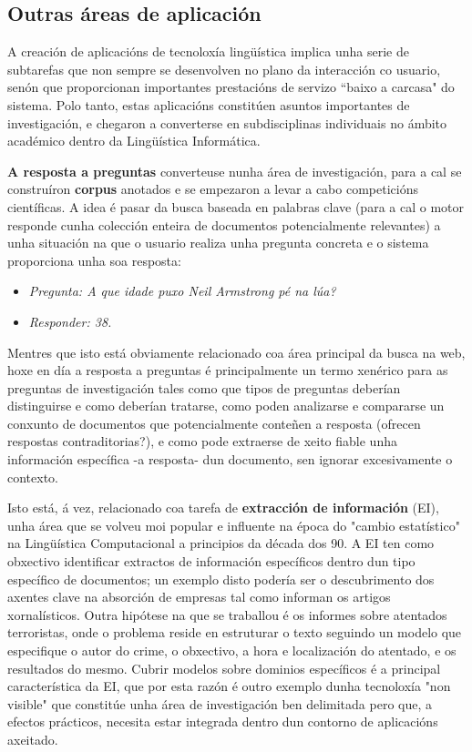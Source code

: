\begin{multicols}{2}
\subsection{Outras áreas de aplicación}

   A creación de aplicacións de tecnoloxía lingüística implica unha serie de subtarefas que non sempre se desenvolven no plano da interacción co usuario, senón que proporcionan importantes prestacións de servizo “baixo a carcasa" do sistema. Polo tanto, estas aplicacións constitúen asuntos importantes de investigación, e chegaron a converterse en subdisciplinas individuais no ámbito académico dentro da Lingüística Informática. 

\textbf{A resposta a preguntas} converteuse nunha área de investigación, para a cal se construíron \textbf{corpus} anotados e se empezaron a levar a cabo competicións científicas. A idea é pasar da busca baseada en palabras clave (para a cal o motor responde cunha colección enteira de documentos potencialmente relevantes) a unha situación na que o usuario realiza unha pregunta concreta e o sistema proporciona unha soa resposta:

\begin{itemize}
\item[] \textit{Pregunta: A que idade puxo Neil Armstrong pé na lúa?}
\item[] \textit{Responder: 38.}
\end{itemize}

Mentres que isto está obviamente relacionado coa área principal da busca na web, hoxe en día a resposta a preguntas é principalmente un termo xenérico para as preguntas de investigación tales como que tipos de preguntas deberían distinguirse e como deberían tratarse, como poden analizarse e compararse un conxunto de documentos que potencialmente conteñen a resposta (ofrecen respostas contraditorias?), e como pode extraerse de xeito fiable unha información específica -a resposta- dun documento, sen ignorar excesivamente o contexto. 

Isto está, á vez, relacionado coa tarefa de \textbf{extracción de información} (EI), unha área que se volveu moi popular e influente na época do "cambio estatístico" na Lingüística Computacional a principios da década dos 90. A EI ten como obxectivo identificar extractos de información específicos dentro dun tipo específico de documentos; un exemplo disto podería ser o descubrimento dos axentes clave na absorción de empresas tal como informan os artigos xornalísticos. Outra hipótese na que se traballou é os informes sobre atentados terroristas, onde o problema reside en estruturar o texto seguindo un modelo que especifique o autor do crime, o obxectivo, a hora e localización do atentado, e os resultados do mesmo. Cubrir modelos sobre dominios específicos é a principal característica da EI, que por esta razón é outro exemplo dunha tecnoloxía "non visible" que constitúe unha área de investigación ben delimitada pero que, a efectos prácticos, necesita estar integrada dentro dun contorno de aplicacións axeitado. 


\end{multicols}

